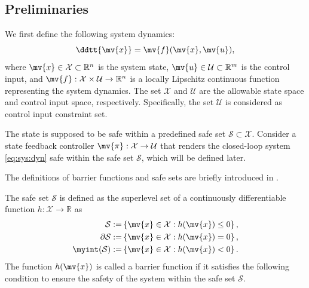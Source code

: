 \subsection{Preliminaries}

We first define the following system dynamics:
\begin{equation}\label{eq:sys:dyn}
    \ddtt{\mv{x}} = \mv{f}(\mv{x},\mv{u})
    ,
\end{equation}
where $\mv{x} \in \mathcal{X} \subset \mathbb{R}^n$ is the system state, $\mv{u} \in \mathcal{U} \subset \mathbb{R}^m$ is the control input, and $\mv{f}: \mathcal{X} \times \mathcal{U} \rightarrow \mathbb{R}^n$ is a locally Lipschitz continuous function representing the system dynamics.
The set $\mathcal{X}$ and $\mathcal{U}$ are the allowable state space and control input space, respectively.
Specifically, the set $\mathcal{U}$ is considered as control input constraint set.

The state is supposed to be safe within a predefined safe set $\mathcal{S} \subset \mathcal{X}$.
Consider a state feedback controller $\mv{\pi}: \mathcal{X} \rightarrow \mathcal{U}$ that renders the closed-loop system \eqref{eq:sys:dyn} safe within the safe set $\mathcal{S}$, which will be defined later.

The definitions of barrier functions and safe sets are briefly introduced in \cite{Ames:2019aa, Xiao:2019aa, agrawal:2021aa}.

\begin{definition}
The safe set $\mathcal{S}$ is defined as the superlevel set of a continuously differentiable function $h: \mathcal{X} \rightarrow \mathbb{R}$ as
\begin{equation} \label{eq:safe:set}
    \begin{aligned}
        \mathcal{S} := &
        \left\{
            \mv{x} \in \mathcal{X} : h(\mv{x}) \le 0
        \right\}
        ,
        \\
        \partial \mathcal{S} := &
        \left\{
            \mv{x} \in \mathcal{X} : h(\mv{x}) = 0
        \right\}
        ,
        \\
        \myint(\mathcal{S}) := &
        \left\{
            \mv{x} \in \mathcal{X} : h(\mv{x}) < 0
        \right\}
        .
    \end{aligned}
\end{equation}
The function $h(\mv{x})$ is called a barrier function if it satisfies the following condition to ensure the safety of the system within the safe set $\mathcal{S}$.
\end{definition}

